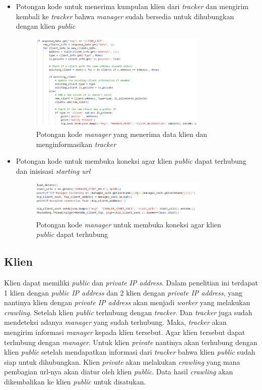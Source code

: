 \begin{itemize}
	\item{Potongan kode untuk menerima kumpulan klien dari \emph{tracker} dan mengirim kembali ke \emph{tracker} bahwa \emph{manager} sudah bersedia untuk dihubungkan dengan klien \emph{public}}
	\begin{figure}[H]
		\centering{}
		\includegraphics[width=0.8\textwidth]{gambar/kode/potongan_manager_01}
		\caption{Potongan kode \emph{manager} yang menerima data klien dan menginformasikan \emph{tracker}}
	\end{figure}

	\item{Potongan kode untuk membuka koneksi agar klien \emph{public} dapat terhubung dan inisisasi \emph{starting url}}
	\begin{figure}[H]
		\centering{}
		\includegraphics[width=0.8\textwidth]{gambar/kode/potongan_manager_02}
		\caption{Potongan kode \emph{manager} untuk membuka koneksi agar klien \emph{public} dapat terhubung}
	\end{figure}
\end{itemize}

\subsection{Klien}
Klien dapat memiliki \emph{public} dan \emph{private IP address}. Dalam penelitian ini terdapat 1 klien dengan \emph{public IP address} dan 2 klien dengan \emph{private IP address}, yang nantinya klien dengan \emph{private IP address} akan menjadi \emph{worker} yang melakukan \emph{crawling}. Setelah klien \emph{public} terhubung dengan \emph{tracker}. Dan \emph{tracker} juga sudah mendeteksi adanya \emph{manager} yang sudah terhubung. Maka, \emph{tracker} akan mengirim informasi \emph{manager} kepada klien tersebut. Agar klien tersebut dapat terhubung dengan \emph{manager}. Untuk klien \emph{private} nantinya akan terhubung dengan klien \emph{public} setelah mendapatkan informasi dari \emph{tracker} bahwa klien \emph{public} sudah siap untuk dihubungkan. Klien \emph{private} akan melakukan \emph{crawling} yang mana pembagian url-nya akan diatur oleh klien \emph{public}. Data hasil \emph{crawling} akan dikembalikan ke klien \emph{public} untuk disatukan. 

